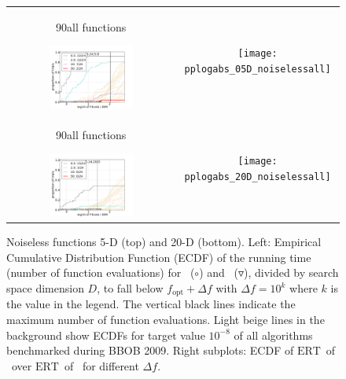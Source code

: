 \documentclass{article}
\newcommand{\ERT}{\ensuremath{\mathrm{ERT}}}
\newcommand{\Df}{\ensuremath{\Delta f}}
\newcommand{\fopt}{\ensuremath{f_\mathrm{opt}}}
\newcommand{\rot}[2][2.5]{
  \hspace*{-3.5\baselineskip}%
  \begin{rotate}{90}\hspace{#1em}#2
  \end{rotate}}
\begin{document}
\begin{figure}[htbp!]
\centering
\begin{tabular}{@{}c@{}c@{}}
\rot[5]{all functions}\includegraphics[width=0.528\textwidth,trim=0 0mm 16mm 11mm, clip]{pprldistr_05D_noiselessall} &
\texttt{[image: pplogabs\_05D\_noiselessall]}\\
\rot[5]{all functions}\includegraphics[width=0.528\textwidth,trim=0 0mm 16mm 11mm, clip]{pprldistr_20D_noiselessall} &
\texttt{[image: pplogabs\_20D\_noiselessall]}
\end{tabular}
\caption{\label{fig:RLDs05Da}Noiseless functions 5-D (top) and 20-D (bottom).
Left:
Empirical Cumulative Distribution Function (ECDF) of the running time (number
of function evaluations) for \algorithmB\ ($\circ$) and \algorithmA\ ($\triangledown$), divided by
search space dimension $D$, to fall below $\fopt+\Df$ with $\Df = 10^k$ where
$k$ is the value in the legend. The vertical black lines indicate the maximum
number of function evaluations. Light beige lines in the background show ECDFs
for target value $10^{-8}$ of all algorithms benchmarked during BBOB 2009.
Right subplots: ECDF of \ERT\ of \algorithmB\ over \ERT\ of \algorithmA\ for
different $\Df$.
}
\end{figure}
\end{document}
